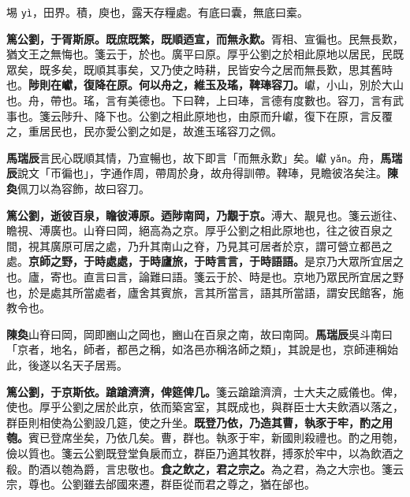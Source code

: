\begin{quoting}埸 \texttt{yì}，田界。積，庾也，露天存糧處。有底曰囊，無底曰槖。\end{quoting}

\textbf{篤公劉，于胥斯原。既庶既繁，既順迺宣，而無永歎。}{\footnotesize 胥相、宣徧也。民無長歎，猶文王之無悔也。箋云于，於也。廣平曰原。厚乎公劉之於相此原地以居民，民既眾矣，既多矣，既順其事矣，又乃使之時耕，民皆安今之居而無長歎，思其舊時也。}\textbf{陟則在巘，復降在原。何以舟之，維玉及瑤，鞞琫容刀。}{\footnotesize 巘，小山，別於大山也。舟，帶也。瑤，言有美德也。下曰鞞，上曰琫，言德有度數也。容刀，言有武事也。箋云陟升、降下也。公劉之相此原地也，由原而升巘，復下在原，言反覆之，重居民也，民亦愛公劉之如是，故進玉瑤容刀之佩。}

\begin{quoting}\textbf{馬瑞辰}言民心既順其情，乃宣暢也，故下即言「而無永歎」矣。巘 \texttt{yǎn}。舟，\textbf{馬瑞辰}說文「帀徧也」，字通作周，帶周於身，故舟得訓帶。鞞琫，見瞻彼洛矣注。\textbf{陳奐}佩刀以為容飾，故曰容刀。\end{quoting}

\textbf{篤公劉，逝彼百泉，瞻彼溥原。迺陟南岡，乃覯于京。}{\footnotesize 溥大、覯見也。箋云逝往、瞻視、溥廣也。山脊曰岡，絕高為之京。厚乎公劉之相此原地也，往之彼百泉之間，視其廣原可居之處，乃升其南山之脊，乃見其可居者於京，謂可營立都邑之處。}\textbf{京師之野，于時處處，于時廬旅，于時言言，于時語語。}{\footnotesize 是京乃大眾所宜居之也。廬，寄也。直言曰言，論難曰語。箋云于於、時是也。京地乃眾民所宜居之野也，於是處其所當處者，廬舍其賓旅，言其所當言，語其所當語，謂安民館客，施教令也。}

\begin{quoting}\textbf{陳奐}山脊曰岡，岡即豳山之岡也，豳山在百泉之南，故曰南岡。\textbf{馬瑞辰}吳斗南曰「京者，地名，師者，都邑之稱，如洛邑亦稱洛師之類」，其說是也，京師連稱始此，後遂以名天子居焉。\end{quoting}

\textbf{篤公劉，于京斯依。蹌蹌濟濟，俾筵俾几。}{\footnotesize 箋云蹌蹌濟濟，士大夫之威儀也。俾，使也。厚乎公劉之居於此京，依而築宮室，其既成也，與群臣士大夫飲酒以落之，群臣則相使為公劉設几筵，使之升坐。}\textbf{既登乃依，乃造其曹，執豕于牢，酌之用匏。}{\footnotesize 賓已登席坐矣，乃依几矣。曹，群也。執豕于牢，新國則殺禮也。酌之用匏，儉以質也。箋云公劉既登堂負扆而立，群臣乃適其牧群，搏豕於牢中，以為飲酒之殽。酌酒以匏為爵，言忠敬也。}\textbf{食之飲之，君之宗之。}{\footnotesize 為之君，為之大宗也。箋云宗，尊也。公劉雖去邰國來遷，群臣從而君之尊之，猶在邰也。}

